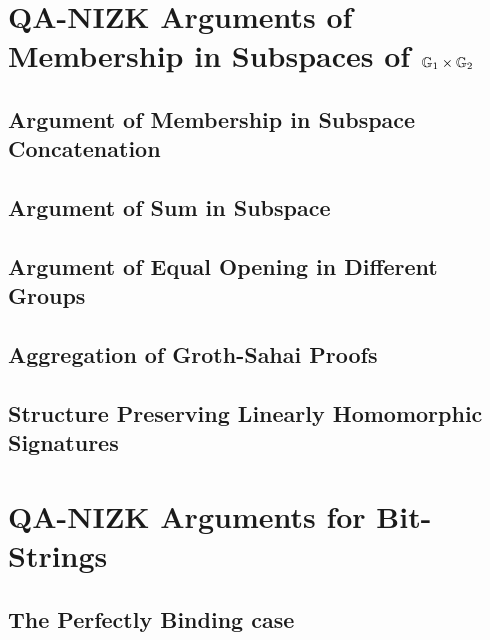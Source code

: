     
\chapter{QA-NIZK Arguments of Membership in Subspaces of $\mathbb{G}_1\times\mathbb{G}_2$}\label{sec:agg-asym}
    
    

    \section{Argument of Membership in Subspace Concatenation}\label{sec:concat}

        

    \section{Argument of Sum in Subspace}\label{sec:sum}
        
        

    \section{Argument of Equal Opening in Different Groups} \label{sec:aggcommit}

         

    \section{Aggregation of Groth-Sahai Proofs}\label{sec:agg-gs}

        

    \section{Structure Preserving Linearly Homomorphic Signatures}

        

\chapter {QA-NIZK Arguments for Bit-Strings} \label{sec:bits}

    

    \section{The Perfectly Binding case} \label{sec:bits-binding} 
    
